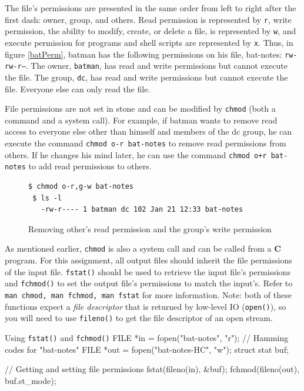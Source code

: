 \documentclass[11pt]{article}
\begin{document}
The file's permissions
are presented in the same order from left to right after the first dash: owner, group, and others. 
Read permission is represented by
\texttt{r}, write permission, the ability to modify, create, or delete a file, is represented by \texttt{w},
and execute permission for programs and shell
scripts are represented by \texttt{x}. Thus, in figure \ref{batPerm}, batman has the following permissions
on his file, bat-notes: \texttt{rw-rw-r--}. The owner, \texttt{batman}, has read and write permissions but cannot execute
the file. The group, \texttt{dc}, has read and write permissions but cannot execute the file. Everyone else can only
read the file.

File permissions are not set in stone and can be modified by \texttt{chmod} (both a command and a system call). 
For example, if batman wants to
remove read access to everyone else other than himself and members of the dc group, he can execute the
command \texttt{chmod o-r bat-notes} to remove read permissions from others. If he changes his mind later,
he can use the command \texttt{chmod o+r bat-notes} to add read permissions to others.

\begin{figure}[h]
\begin{centering}
  \begin{lstlisting}[style=bashstyle]
 $ chmod o-r,g-w bat-notes
 $ ls -l
   -rw-r---- 1 batman dc 102 Jan 21 12:33 bat-notes
  \end{lstlisting}
  \caption{Removing other's read permission and the group's write permission}
  \label{batPerm1}
\end{centering}
\end{figure}

As mentioned earlier, \texttt{chmod} is also a system call and can be called from a \textbf{C} program.
For this assignment, all output files should inherit the file permissions of the input file. \texttt{fstat()}
should be used to retrieve the input file's permissions and \texttt{fchmod()} to set the output file's
permissions to match the input's. Refer to \texttt{man chmod, man fchmod, man fstat} for more information.
Note: both of these functions expect a \emph{file descriptor} that is returned by low-level IO
(\texttt{open()}), so you will need to use \texttt{fileno()} to get the file descriptor of an open stream.

\begin{codelisting}{Using \texttt{fstat()} and \texttt{fchmod()}}
 FILE *in = fopen("bat-notes", "r");
 // Hamming codes for "bat-notes"
 FILE *out = fopen("bat-notes-HC", "w");
 struct stat buf;
 
 // Getting and setting file permissions
 fstat(fileno(in), &buf);
 fchmod(fileno(out), buf.st_mode);
\end{codelisting}
\end{document}
